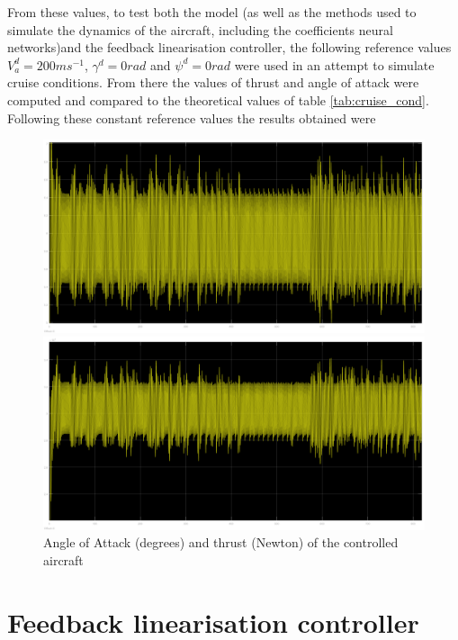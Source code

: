 From these values, to test both the model (as well as the methods used to simulate the dynamics of the aircraft, including the coefficients neural networks)and the feedback linearisation controller, the following reference values $V_a^d=200 ms^{-1}$, $\gamma^d = 0 rad$ and $\psi^d=0 rad$ were used in an attempt to simulate cruise conditions. From there the values of thrust and angle of attack were computed and  compared to the theoretical values of table \ref{tab:cruise_cond}. 
Following these constant reference values the results obtained were

\begin{figure}
\centering
\begin{minipage}{0.49\textwidth}
\includegraphics[width=\textwidth]{Figures/Results/aoa_check.PNG}
\end{minipage}
\begin{minipage}{0.49\textwidth}
\includegraphics[width=\textwidth]{Figures/Results/thrust_check.PNG}
\end{minipage}
\caption[AoA and thrust validation]{Angle of Attack (degrees) and thrust (Newton) of the controlled aircraft}
\end{figure}
\section{Feedback linearisation controller}
\label{section:results/fl_contro}

